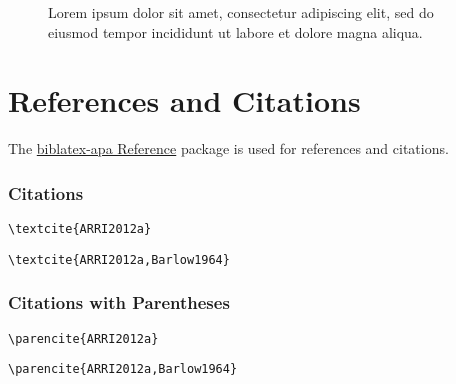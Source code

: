 \begin{figure}
    
    \caption{
        Lorem ipsum dolor sit amet, consectetur adipiscing elit,
        sed do eiusmod tempor incididunt ut labore et dolore magna aliqua.
    }
\end{figure}

\section{References and Citations}

The \href{https://ctan.org/pkg/biblatex-apa}{biblatex-apa Reference}
package is used for references and citations.

\subsubsection{Citations}

\begin{lstlisting}[caption=Citation for Single Author.]
\textcite{ARRI2012a}
\end{lstlisting}

\textcite{ARRI2012a}

\begin{lstlisting}[caption=Citation for Multiple Authors.]
\textcite{ARRI2012a,Barlow1964}
\end{lstlisting}

\textcite{ARRI2012a,Barlow1964}

\subsubsection{Citations with Parentheses}

\begin{lstlisting}[caption=Citation with Parentheses for Single Author.]
\parencite{ARRI2012a}
\end{lstlisting}

\parencite{ARRI2012a}

\begin{lstlisting}[caption=Citation with Parentheses for Multiple Authors.]
    \parencite{ARRI2012a,Barlow1964}
\end{lstlisting}

\parencite{ARRI2012a,Barlow1964}
